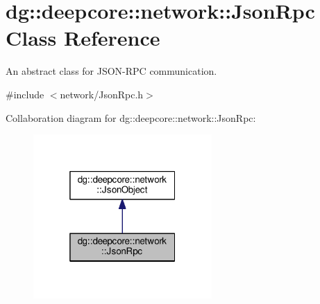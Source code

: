 \hypertarget{classdg_1_1deepcore_1_1network_1_1_json_rpc}{}\section{dg\+:\+:deepcore\+:\+:network\+:\+:Json\+Rpc Class Reference}
\label{classdg_1_1deepcore_1_1network_1_1_json_rpc}


An abstract class for J\+S\+O\+N-\/\+R\+PC communication.  




{\ttfamily \#include $<$network/\+Json\+Rpc.\+h$>$}



Collaboration diagram for dg\+:\+:deepcore\+:\+:network\+:\+:Json\+Rpc\+:
\nopagebreak
\begin{figure}[H]
\begin{center}
\leavevmode
\includegraphics[width=193pt]{classdg_1_1deepcore_1_1network_1_1_json_rpc__coll__graph}
\end{center}
\end{figure}
